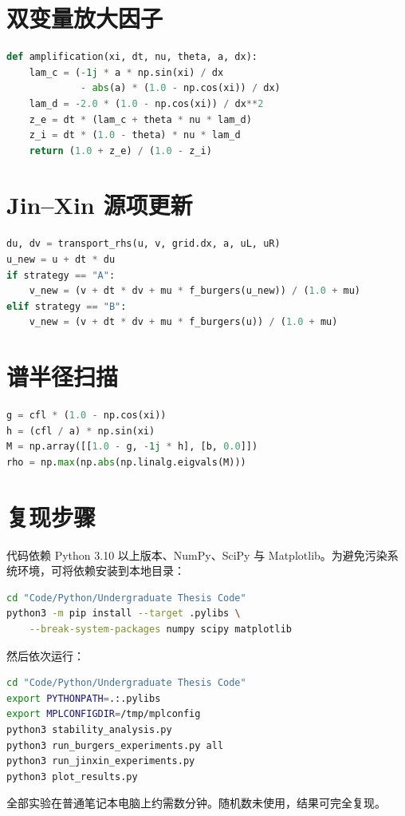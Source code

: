 \section{双变量放大因子}

\begin{lstlisting}[language=Python,caption={离散符号与放大因子}]
def amplification(xi, dt, nu, theta, a, dx):
    lam_c = (-1j * a * np.sin(xi) / dx
             - abs(a) * (1.0 - np.cos(xi)) / dx)
    lam_d = -2.0 * (1.0 - np.cos(xi)) / dx**2
    z_e = dt * (lam_c + theta * nu * lam_d)
    z_i = dt * (1.0 - theta) * nu * lam_d
    return (1.0 + z_e) / (1.0 - z_i)
\end{lstlisting}

\section{Jin--Xin 源项更新}

\begin{lstlisting}[language=Python,caption={策略 A 与策略 B 的源项更新}]
du, dv = transport_rhs(u, v, grid.dx, a, uL, uR)
u_new = u + dt * du
if strategy == "A":
    v_new = (v + dt * dv + mu * f_burgers(u_new)) / (1.0 + mu)
elif strategy == "B":
    v_new = (v + dt * dv + mu * f_burgers(u)) / (1.0 + mu)
\end{lstlisting}

\section{谱半径扫描}

\begin{lstlisting}[language=Python,caption={策略 B 刚性极限的谱半径}]
g = cfl * (1.0 - np.cos(xi))
h = (cfl / a) * np.sin(xi)
M = np.array([[1.0 - g, -1j * h], [b, 0.0]])
rho = np.max(np.abs(np.linalg.eigvals(M)))
\end{lstlisting}

\section{复现步骤}

代码依赖 Python 3.10 以上版本、NumPy、SciPy 与 Matplotlib。为避免污染系统环境，可将依赖安装到本地目录：

\begin{lstlisting}[language=bash,caption={安装依赖}]
cd "Code/Python/Undergraduate Thesis Code"
python3 -m pip install --target .pylibs \
    --break-system-packages numpy scipy matplotlib
\end{lstlisting}

然后依次运行：

\begin{lstlisting}[language=bash,caption={生成图片与数据}]
cd "Code/Python/Undergraduate Thesis Code"
export PYTHONPATH=.:.pylibs
export MPLCONFIGDIR=/tmp/mplconfig
python3 stability_analysis.py
python3 run_burgers_experiments.py all
python3 run_jinxin_experiments.py
python3 plot_results.py
\end{lstlisting}

全部实验在普通笔记本电脑上约需数分钟。随机数未使用，结果可完全复现。
